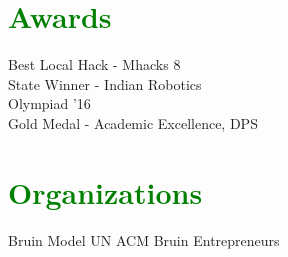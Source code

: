\documentclass[letterpaper]{deedy-resume-openfont} %
\begin{document}
\begin{minipage}[t]{0.33\textwidth}
\sectionsep %


\section{\textcolor{GREEN}{Awards}}

\textbullet{} Best Local Hack - Mhacks 8 \\
\textbullet{} State Winner - Indian Robotics\\ \hspace{.5mm} Olympiad '16\\ 
\textbullet{} Gold Medal - Academic Excellence, DPS\\


\sectionsep %



\section{\textcolor{GREEN}{Organizations}}
Bruin Model UN \textbullet{} ACM \textbullet{} Bruin Entrepreneurs \\



\end{minipage} %
\hfill
%
%
\end{document}

